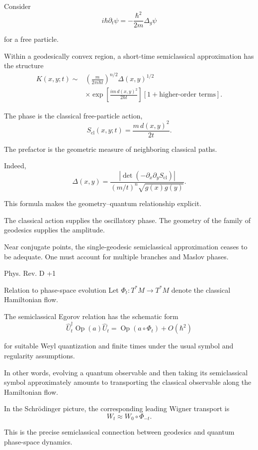 Consider
\[
i\hbar\partial_t\psi
=
-\frac{\hbar^2}{2m}\Delta_g\psi
\tag{85}
\]

for a free particle.

Within a geodesically convex region, a short-time semiclassical approximation has the structure
\[
\boxed{
\begin{aligned}
K(x,y;t)\sim&
\left(\frac{m}{2\pi i\hbar t}\right)^{n/2}
\Delta(x,y)^{1/2}\\
&\times
\exp\left[
\frac{im\,d(x,y)^2}{2\hbar t}
\right]
\left[1+\text{higher-order terms}\right].
\end{aligned}
}
\tag{86}
\]

The phase is the classical free-particle action,
\[
S_{\mathrm{cl}}(x,y;t)
=
\frac{m\,d(x,y)^2}{2t}.
\tag{87}
\]

The prefactor is the geometric measure of neighboring classical paths.

Indeed,
\[
\Delta(x,y)
=
\frac{
\left|\det(-\partial_x\partial_y S_{\mathrm{cl}})\right|
}{
(m/t)^n\sqrt{g(x)g(y)}
}.
\tag{88}
\]

This formula makes the geometry–quantum relationship explicit.

The classical action supplies the oscillatory phase. The geometry of the family of geodesics supplies the amplitude.

Near conjugate points, the single-geodesic semiclassical approximation ceases to be adequate. One must account for multiple branches and Maslov phases. 

Phys. Rev. D
+1



Relation to phase-space evolution
Let \(\Phi_t:T^*M\to T^*M\) denote the classical Hamiltonian flow.

The semiclassical Egorov relation has the schematic form
\[
\widehat U_t^\dagger
\operatorname{Op}(a)\widehat U_t
=
\operatorname{Op}(a\circ\Phi_t)
+O(\hbar^2)
\tag{89}
\]

for suitable Weyl quantization and finite times under the usual symbol and regularity assumptions.

In other words, evolving a quantum observable and then taking its semiclassical symbol approximately amounts to transporting the classical observable along the Hamiltonian flow.

In the Schrödinger picture, the corresponding leading Wigner transport is
\[
W_t\approx W_0\circ\Phi_{-t}.
\tag{90}
\]

This is the precise semiclassical connection between geodesics and quantum phase-space dynamics.

